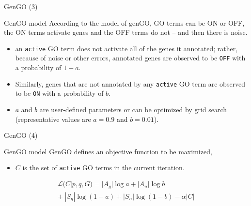 \documentclass{beamer}
\begin{document}
\begin{frame}{GenGO (3)}
\begin{mybluebox}{GenGO model}
According to the model of genGO, GO terms can be ON or OFF, the ON terms activate genes and the OFF terms do not -- and then there is noise.
\end{mybluebox}

\begin{itemize}
 \item   an \texttt{active} GO term does not
activate all of the genes it annotated; rather, because of noise or
other errors, annotated genes are observed to be \texttt{OFF} with a
probability of $1-a$. 
\item Similarly, genes that are not annotated by any
\texttt{active} GO term are observed to be \texttt{ON} with a
probability of $b$. 
\item $a$ and $b$ are user-defined parameters or can be optimized by grid search (representative values are $a=0.9$ and $b=0.01$).
\end{itemize}

 
\end{frame}


\begin{frame}{GenGO (4)}
\begin{mybluebox}{GenGO model}
GenGO defines an objective function to be maximized,
\end{mybluebox}

\begin{itemize}
\item $C$ is the set of \texttt{active} GO terms in the current
iteration.
\end{itemize}

\begin{multline}
\mathcal{L}(C|p,q,G) = |A_g|\log a + |A_n|\log b  \\ + \; |S_g|\log (1-a)
+ |S_n| \log (1-b) - \alpha |C|
\label{eq:genGO}
\end{multline}
 
\end{frame}
\end{document}
